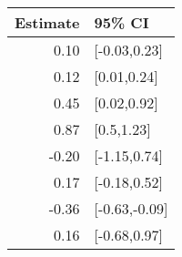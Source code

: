 \begin{tabular}{rl}
  \hline
Estimate & 95\% CI \\ 
  \hline
0.10 & [-0.03,0.23] \\ 
  0.12 & [0.01,0.24] \\ 
  0.45 & [0.02,0.92] \\ 
  0.87 & [0.5,1.23] \\ 
  -0.20 & [-1.15,0.74] \\ 
  0.17 & [-0.18,0.52] \\ 
  -0.36 & [-0.63,-0.09] \\ 
  0.16 & [-0.68,0.97] \\ 
   \hline
\end{tabular}

